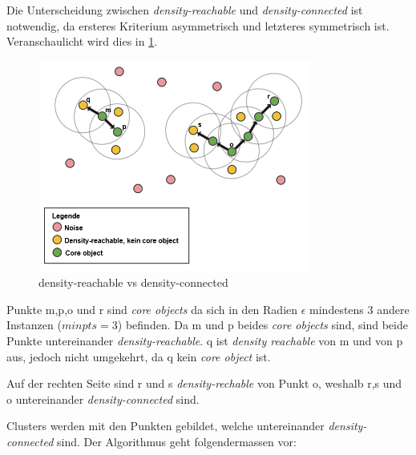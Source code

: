 Die Unterscheidung zwischen \textit{density-reachable} und \textit{density-connected} ist notwendig, da ersteres Kriterium asymmetrisch und letzteres symmetrisch ist. Veranschaulicht wird dies in \cref{fig:recherche:clusteranalysis:DBSCAN}.

\begin{figure}[H]
	\RawFloats
	\centering
	\includegraphics[width=0.8\textwidth]{images/density-reachable-vs-connected.png}
	\caption{density-reachable vs density-connected}
	\label{fig:recherche:clusteranalysis:DBSCAN}
\end{figure}

Punkte m,p,o und r sind \textit{core objects} da sich in den Radien $\epsilon$ mindestens 3 andere Instanzen ($minpts = 3$) befinden. Da m und p beides \textit{core objects} sind, sind beide Punkte untereinander \textit{density-reachable}. q ist \textit{density reachable} von m und von p aus, jedoch nicht umgekehrt, da q kein \textit{core object} ist. 

Auf der rechten Seite sind r und s \textit{density-rechable} von Punkt o, weshalb r,s und o untereinander \textit{density-connected} sind.

Clusters werden mit den Punkten gebildet, welche untereinander \textit{density-connected} sind. 
Der Algorithmus geht folgendermassen vor:

